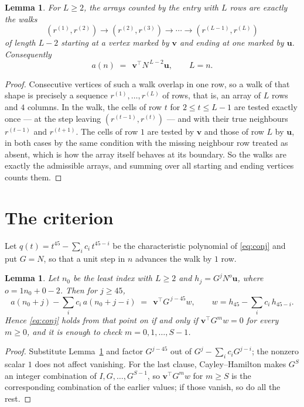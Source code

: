 \documentclass[11pt,a4paper]{article}
\theoremstyle{plain}
\newtheorem{lemma}[theorem]{Lemma}
\theoremstyle{definition}
\begin{document}
\begin{lemma}\label{lem:walk}
For $L\ge2$, the arrays counted by the entry with $L$ rows are exactly the walks
\[
(r^{(1)},r^{(2)})\to(r^{(2)},r^{(3)})\to\cdots\to(r^{(L-1)},r^{(L)})
\]
of length $L-2$ starting at a vertex marked by $\mathbf{v}$ and ending at one marked by
$\mathbf{u}$. Consequently
\[
a(n)\;=\;\,\mathbf{v}^{\!\top}N^{\,L-2}\mathbf{u},\qquad L=n .
\]
\end{lemma}

\begin{proof}
Consecutive vertices of such a walk overlap in one row, so a walk of that shape is
precisely a sequence $r^{(1)},\dots,r^{(L)}$ of rows, that is, an array of $L$ rows
and $4$ columns. In the walk, the cells of row $t$ for $2\le t\le L-1$ are tested
exactly once --- at the step leaving $(r^{(t-1)},r^{(t)})$ --- and with their true
neighbours $r^{(t-1)}$ and $r^{(t+1)}$. The cells of row $1$ are tested by
$\mathbf{v}$ and those of row $L$ by $\mathbf{u}$, in both cases by the same condition
with the missing neighbour row treated as absent, which is how the array itself behaves at
its boundary. So the walks are exactly the admissible arrays, and summing over all starting
and ending vertices counts them.
\end{proof}

\section{The criterion}

Let $q(t)=t^{45}-\sum_i c_i\,t^{45-i}$ be the characteristic polynomial of
\eqref{eq:conj} and put $G=N$, so that a unit step in $n$ advances the walk by
$1$ row.

\begin{lemma}\label{lem:crit}
Let $n_0$ be the least index with $L\ge2$ and $h_j=G^{j}N^{o}\mathbf{u}$, where
$o=1n_0+0-2$. Then for $j\ge45$,
\[
a(n_0+j)-\sum_i c_i\,a(n_0+j-i)\;=\;\,\mathbf{v}^{\!\top}G^{\,j-45}w,
\qquad w=h_{45}-\sum_i c_i\,h_{45-i} .
\]
Hence \eqref{eq:conj} holds from that point on if and only if
$\mathbf{v}^{\!\top}G^{m}w=0$ for every $m\ge0$, and it is enough to check
$m=0,1,\dots,S-1$.
\end{lemma}

\begin{proof}
Substitute Lemma~\ref{lem:walk} and factor $G^{j-45}$ out of
$G^{j}-\sum_ic_iG^{j-i}$; the nonzero scalar $1$ does not affect
vanishing. For the last clause, Cayley--Hamilton makes $G^{S}$ an integer combination of
$I,G,\dots,G^{S-1}$, so $\mathbf{v}^{\!\top}G^{m}w$ for $m\ge S$ is the corresponding
combination of the earlier values; if those vanish, so do all the rest.
\end{proof}
\end{document}
